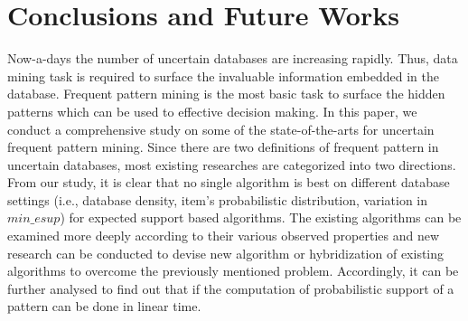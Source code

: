 \section{Conclusions and Future Works}
Now-a-days the number of uncertain databases are increasing rapidly. Thus, data mining task is required to surface the invaluable information embedded in the database. Frequent pattern mining is the most basic task to surface the hidden patterns which can be used to effective decision making. In this paper, we conduct a comprehensive study on some of the state-of-the-arts for uncertain frequent pattern mining. Since there are two definitions of frequent pattern in uncertain databases, most existing researches are categorized into two directions. From our study, it is clear that no single algorithm is best on different database settings (i.e., database density, item's probabilistic distribution, variation in $min\_esup$) for expected support based algorithms. The existing algorithms can be examined more deeply according to their various observed properties and new research can be conducted to devise new algorithm or hybridization of existing algorithms to overcome the previously mentioned problem. Accordingly, it can be further analysed to find out that if the  computation of probabilistic support of a pattern can be done in linear time.







 